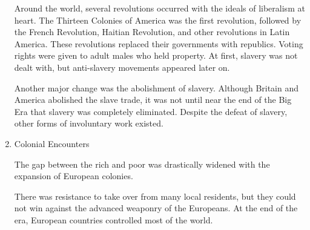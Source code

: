 \documentclass[11pt]{article}
\begin{document}
\begin{enumerate}
Around the world, several revolutions occurred with the ideals of liberalism at heart. The Thirteen Colonies of America was the first revolution, followed by the French Revolution, Haitian Revolution, and other revolutions in Latin America. These revolutions replaced their governments with republics. Voting rights were given to adult males who held property. At first, slavery was not dealt with, but anti-slavery movements appeared later on.

Another major change was the abolishment of slavery. Although Britain and America abolished the slave trade, it was not until near the end of the Big Era that slavery was completely eliminated. Despite the defeat of slavery, other forms of involuntary work existed.

\item Colonial Encounters
\label{sec:orga4d51fd}

The gap between the rich and poor was drastically widened with the expansion of European colonies.

There was resistance to take over from many local residents, but they could not win against the advanced weaponry of the Europeans. At the end of the era, European countries controlled most of the world.
\end{enumerate}
\end{document}
